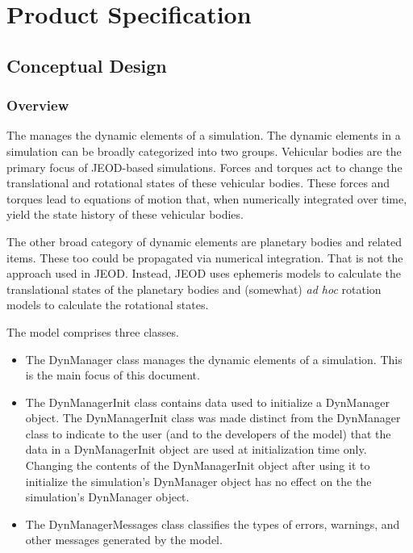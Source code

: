 %
%

\chapter{Product Specification}
\label{ch:spec}

\section{Conceptual Design}

\subsection{Overview}

The \ModelDesc manages the dynamic elements of a simulation.
The dynamic elements in a simulation can be broadly categorized into two groups.
Vehicular bodies are the primary focus of JEOD-based simulations.
Forces and torques act to change the translational and rotational states
of these vehicular bodies. These forces and torques lead to equations of
motion that, when numerically integrated over time, yield the state history
of these vehicular bodies.

The other broad category of dynamic elements are planetary bodies and
related items. These too could be propagated via numerical integration.
That is not the approach used in JEOD. Instead, JEOD uses ephemeris models
to calculate the translational states of the planetary bodies and
(somewhat) \emph{ad hoc} rotation models to calculate the rotational states.

The model comprises three classes.\begin{itemize}
\item The DynManager class manages the dynamic elements of a simulation.
This is the main focus of this document.
\item The DynManagerInit class contains data used to initialize a DynManager
object. The DynManagerInit class was made distinct from the DynManager class
to indicate to the user (and to the developers of the model) that the
data in a DynManagerInit object are used at initialization time only.
Changing the contents of the DynManagerInit object after using it to
initialize the simulation's DynManager object has no effect on the
the simulation's DynManager object.
\item The DynManagerMessages class classifies the types of errors, warnings,
and other messages generated by the model.
\end{itemize}

